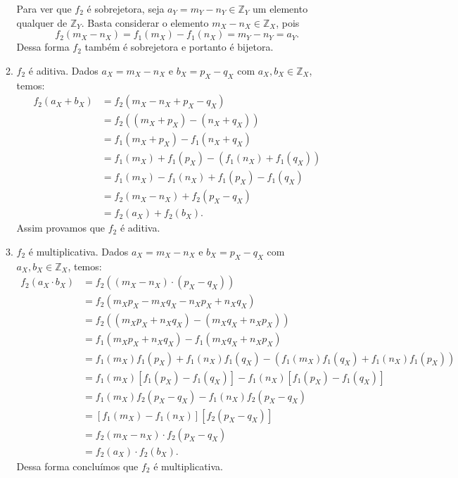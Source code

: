 \documentclass[../main.tex]{subfiles}
\begin{document}
\begin{dem}
\begin{enumerate}
\begin{enumerate}
            Para ver que $f_2$ é sobrejetora, seja $a_Y = m_Y - n_Y \in \mathbb{Z}_Y$ um elemento qualquer de $\mathbb{Z}_Y$. Basta considerar o elemento 
            $m_X - n_X \in \mathbb{Z}_X$, pois 
            \[ f_2(m_X - n_X) = f_1(m_X) - f_1(n_X) = m_Y - n_Y = a_Y. \] 
            Dessa forma $f_2$ também é sobrejetora e portanto é bijetora.

            \item $f_2$ é aditiva. Dados $a_X = m_X - n_X$ e $b_X = p_X - q_X$ com $a_X, b_X \in \mathbb{Z}_X$, temos:
            \begin{align*}
                f_2(a_X + b_X) &= f_2(m_X - n_X + p_X - q_X) \\
                &= f_2((m_X + p_X) - (n_X + q_X)) \\
                &= f_1(m_X + p_X) - f_1(n_X+q_X) \\
                &= f_1(m_X) + f_1(p_X) - (f_1(n_X) + f_1(q_X)) \\
                &= f_1(m_X) - f_1(n_X) + f_1(p_X) - f_1(q_X) \\
                &= f_2(m_X - n_X) + f_2(p_X - q_X) \\
                &= f_2(a_X) + f_2(b_X).
            \end{align*}
            Assim provamos que $f_2$ é aditiva.

            \item $f_2$ é multiplicativa. Dados $a_X = m_X - n_X$ e $b_X = p_X - q_X$ com $a_X, b_X \in \mathbb{Z}_X$, temos:
            \begin{align*}
                f_2(a_X \cdot b_X) 
                &= f_2( (m_X - n_X) \cdot (p_X - q_X) ) \\
                &= f_2( m_Xp_X - m_Xq_X - n_Xp_X + n_Xq_X ) \\
                &= f_2( (m_Xp_X + n_Xq_X) - (m_Xq_X + n_Xp_X) ) \\
                &= f_1 (m_Xp_X + n_Xq_X) - f_1(m_Xq_X + n_Xp_X) \\
                &= f_1(m_X) f_1(p_X) + f_1(n_X)f_1(q_X) - (f_1(m_X)f_1(q_X)+f_1(n_X)f_1(p_X)) \\
                &= f_1(m_X)[f_1(p_X)-f_1(q_X)]-f_1(n_X)[f_1(p_X)-f_1(q_X)] \\
                &= f_1(m_X)f_2(p_X - q_X) - f_1(n_X)f_2(p_X-q_X) \\
                &= [f_1(m_X) - f_1(n_X)][f_2(p_X-q_X)] \\
                &= f_2(m_X-n_X) \cdot f_2(p_X-q_X) \\
                &= f_2(a_X) \cdot f_2(b_X).
            \end{align*}
            Dessa forma concluímos que $f_2$ é multiplicativa.


\end{enumerate}
\end{enumerate}
\end{dem}
\end{document}
